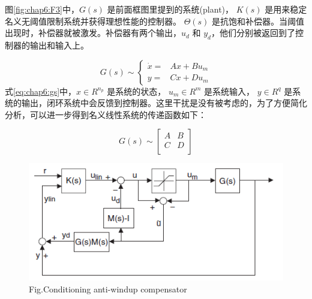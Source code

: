 图\ref{fig:chap6:F3}中，$G(s)$ 是前面框图里提到的系统(plant)， $K(s)$ 是用来稳定名义无阈值限制系统并获得理想性能的控制器。 $\Theta(s)$ 是抗饱和补偿器。当阈值出现时，补偿器就被激发。补偿器有两个输出，$u_d$ 和 $y_d$，他们分别被返回到了控制器的输出和输入上。

\begin{equation}
\label{eq:chap6:gs}
G(s) \sim \left\{\begin{matrix}
 \dot x  =& Ax+B u_{m} \\
 y       =& Cx+D u_{m}
\end{matrix}\right.
\end{equation}
式\ref{eq:chap6:gs}中，$x \in R^{n_p}$ 是系统的状态， $u_m \in R^m$ 是系统输入， $y \in R^q$ 是系统的输出，闭环系统中会反馈到控制器。这里干扰是没有被考虑的，为了方便简化分析，可以进一步得到名义线性系统的传递函数如下：

\begin{equation}
\label{eq:chap6:gs_n}
G(s) \sim
\begin{bmatrix}
A & B\\
C & D \\
\end{bmatrix}
\end{equation}



\begin{figure}[!htp]
\centering
 \includegraphics[width=14cm]{figure/chap6/condition_AW.png}
 \label{fig:chap6:F4}
  {Fig.}{Conditioning anti-windup compensator}
\end{figure}

